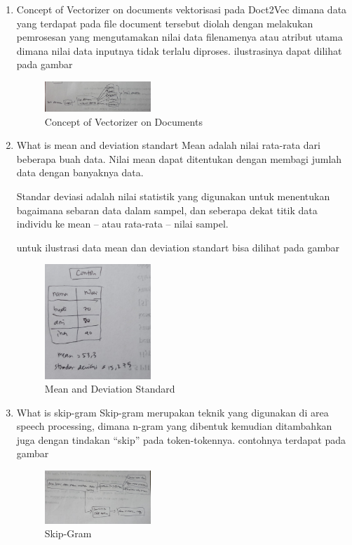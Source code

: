 \begin{enumerate}
        \item Concept of Vectorizer on documents
        \subitem vektorisasi pada Doct2Vec dimana data yang terdapat pada file document tersebut diolah dengan melakukan pemrosesan yang mengutamakan nilai data filenamenya atau atribut utama dimana nilai data inputnya tidak terlalu diproses. ilustrasinya dapat dilihat pada gambar
        \begin{figure}[H]
            \includegraphics[width=4cm]{figures/1174040/chapter5/teori4.jpeg}
            \centering
            \caption{Concept of Vectorizer on Documents}
        \end{figure}
        
        \item What is mean and deviation standart
        \subitem Mean adalah nilai rata-rata dari beberapa buah data. Nilai mean dapat ditentukan dengan membagi jumlah data dengan banyaknya data.
        
        \subitem Standar deviasi adalah nilai statistik yang digunakan untuk menentukan bagaimana sebaran data dalam sampel, dan seberapa dekat titik data individu ke mean – atau rata-rata – nilai sampel.
        
        untuk ilustrasi data mean dan deviation standart bisa dilihat pada gambar
        \begin{figure}[H]
            \includegraphics[width=4cm]{figures/1174040/chapter5/teori5.jpeg}
            \centering
            \caption{Mean and Deviation Standard}
        \end{figure}
        
        \item What is skip-gram
        \subitem Skip-gram merupakan teknik yang digunakan di area speech processing, dimana n-gram yang dibentuk kemudian ditambahkan juga dengan tindakan “skip” pada token-tokennya. contohnya terdapat pada gambar
        \begin{figure}[H]
            \includegraphics[width=4cm]{figures/1174040/chapter5/teori6.jpeg}
            \centering
            \caption{Skip-Gram}
        \end{figure}
    \end{enumerate}
